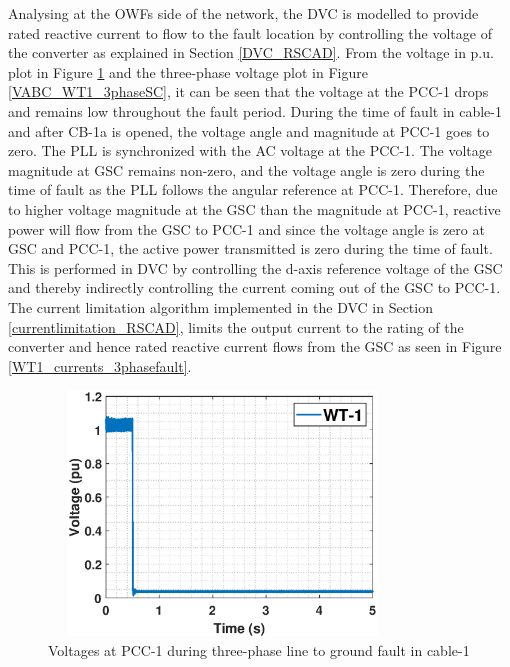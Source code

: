 Analysing at the \gls{OWF}s side of the network, the \gls{DVC} is modelled to provide rated reactive current to flow to the fault location by controlling the voltage of the converter as explained in Section \ref{DVC_RSCAD}. From the voltage in p.u. plot in Figure \ref{WT1_voltages_3phasefault} and the three-phase voltage plot in Figure \ref{VABC_WT1_3phaseSC}, it can be seen that the voltage at the \gls{PCC}-1 drops and remains low throughout the fault period. During the time of fault in cable-1 and after CB-1a is opened, the voltage angle and magnitude at \gls{PCC}-1 goes to zero. The \gls{PLL} is synchronized with the \gls{AC} voltage at the \gls{PCC}-1. The voltage magnitude at \gls{GSC} remains non-zero, and the voltage angle is zero  during the time of fault as the \gls{PLL} follows the angular reference at \gls{PCC}-1. Therefore, due to higher voltage magnitude at the \gls{GSC} than the magnitude at \gls{PCC}-1, reactive power will flow from the \gls{GSC} to \gls{PCC}-1 and since the voltage angle is zero at \gls{GSC} and \gls{PCC}-1, the active power transmitted is zero during the time of fault. This is performed in \gls{DVC} by controlling the d-axis reference voltage of the \gls{GSC} and thereby indirectly controlling the current coming out of the \gls{GSC} to \gls{PCC}-1. The current limitation algorithm implemented in the \gls{DVC} in Section \ref{currentlimitation_RSCAD}, limits the output current to the rating of the converter and hence rated reactive current flows from the \gls{GSC} as seen in Figure \ref{WT1_currents_3phasefault}.

\begin{figure}[H]
\centering
    \includegraphics[height = 6.5cm,width = 9.25cm]{Diagrams/Chapter_5/VACP_WT1_3phaseSC.eps}
    \caption{Voltages at PCC-1 during three-phase line to ground fault in cable-1}
    \label{WT1_voltages_3phasefault}
\end{figure}

